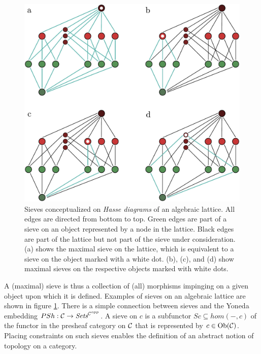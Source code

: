 \documentclass[aps,twocolumn]{revtex4-1}
\begin{document}
\begin{figure}
\noindent\includegraphics[width=1.0\columnwidth]{fig/sieveHasseNoNum.pdf}
\caption{Sieves conceptualized on {\it Hasse diagrams} of an algebraic lattice. All edges are directed from bottom to top. Green edges are part of a sieve on an object represented by a node in the lattice. Black edges are part of the lattice but not part of the sieve under consideration. (a) shows the maximal sieve on the lattice, which is equivalent to a sieve on the object marked with a white dot. (b), (c), and (d) show maximal sieves on the respective objects marked with white dots.}
\label{fig:sieve}
\end{figure}

A (maximal) sieve is thus a collection of (all) morphisms impinging on a given object upon which it is defined. Examples of sieves on an algebraic lattice are shown in figure \ref{fig:sieve}. There is a simple connection between sieves and the Yoneda embedding $PSh:{\mathcal C} \rightarrow \textit{Sets}^{{\mathcal C}^{opp}}$. A sieve on $c$ is a subfunctor $Sc \subseteq hom(-,c)$ of the functor in the presheaf category on ${\mathcal C}$ that is represented by $c \in \mathop{\rm Ob}\nolimits({\mathcal C})$. Placing constraints on such sieves enables the definition of an abstract notion of topology on a category.
\end{document}
